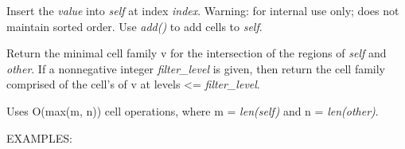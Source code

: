 \documentclass[a4paper,12ptopenany,oneside]{sphinxmanual}
\begin{document}
\begin{fulllineitems}
\begin{fulllineitems}
\end{fulllineitems}


\begin{fulllineitems}
\label{grids:grids.CellFamily.insert}
Insert the \emph{value} into \emph{self} at index \emph{index}.
Warning: for internal use only; does not maintain sorted order.
Use \emph{add()} to add cells to \emph{self}.

\end{fulllineitems}


\begin{fulllineitems}
\label{grids:grids.CellFamily.intersect}
Return the minimal cell family v for the intersection of the regions 
of \emph{self} and \emph{other}. 
If a nonnegative integer \emph{filter\_level} is given, then return the cell
family comprised of the cell's of v at levels \textless{}= \emph{filter\_level}.

Uses O(max(m, n)) cell operations, where m = \emph{len(self)} and
n = \emph{len(other)}.

EXAMPLES:


\end{fulllineitems}
\end{fulllineitems}
\end{document}
